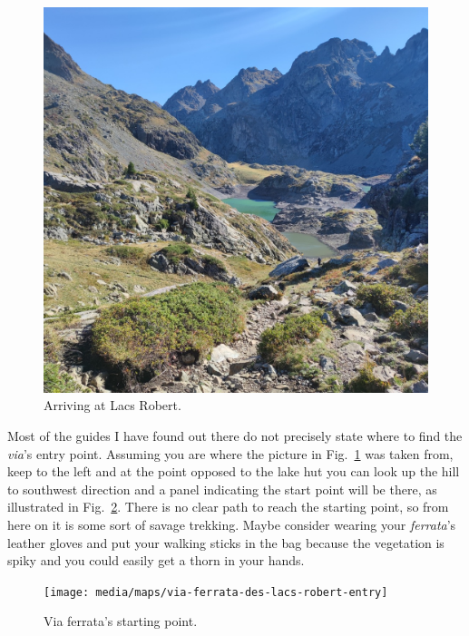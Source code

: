 \begin{figure}[!h]
\centering%
\includegraphics[width=\columnwidth, clip]{media/pictures/via-ferrata-des-lacs-robert-2}
\caption{\label{fig:via-ferrata-des-lacs-robert-2}Arriving at Lacs Robert.}
\end{figure}

Most of the guides I have found out there do not precisely state where to find the \emph{via}'s entry point. Assuming you are where the picture in Fig.~\ref{fig:via-ferrata-des-lacs-robert-2} was taken from, keep to the left and at the point opposed to the lake hut you can look up the hill to southwest direction and a panel indicating the start point will be there, as illustrated in Fig.~\ref{fig:map-via-ferrata-des-lacs-robert-entry}. There is no clear path to reach the starting point, so from here on it is some sort of savage trekking. Maybe consider wearing your \emph{ferrata}'s leather gloves and put your walking sticks in the bag because the vegetation is spiky and you could easily get a thorn in your hands.

\begin{figure}[!h]
\centering%
\texttt{[image: media/maps/via-ferrata-des-lacs-robert-entry]}
\caption{\label{fig:map-via-ferrata-des-lacs-robert-entry}Via ferrata's starting point.}
\end{figure}

